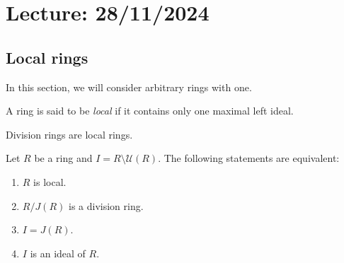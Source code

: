 \section{Lecture: 28/11/2024}
\label{09}

\subsection{Local rings}

In this section, we will consider arbitrary rings with one. 

\begin{definition}
    A ring is said to be \emph{local} if it contains only one maximal left ideal. 
\end{definition}

Division rings are local rings. 


\begin{theorem}
\label{thm:local}
    Let $R$ be a ring and $I=R\setminus\mathcal{U}(R)$. The following
    statements are equivalent:
    \begin{enumerate}
        \item $R$ is local.
        \item $R/J(R)$ is a division ring.
        \item $I=J(R)$.
        \item $I$ is an ideal of $R$.
    \end{enumerate}
\end{theorem}

